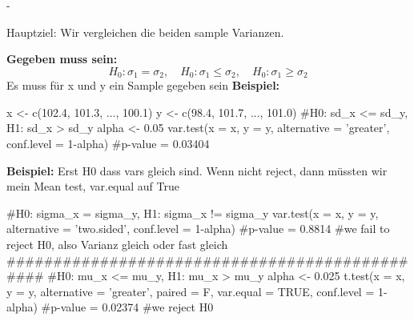 -

\begin{center}
    
\end{center}
\normalsize
Hauptziel: Wir vergleichen die beiden sample Varianzen.
\normalsize
\begin{center}
\end{center}

\large{\textbf{Gegeben muss sein:}}
\[
H_0: \sigma_1 = \sigma_2, \quad 
H_0: \sigma_1 \leq \sigma_2, \quad 
H_0: \sigma_1 \geq \sigma_2
\]
\textcolor{red}{\warning} Es muss für x und y ein Sample gegeben sein \textcolor{red}{\warning}
\large{\textbf{Beispiel:}}
\begin{rcode}{1}
x <- c(102.4, 101.3, ..., 100.1)
y <- c(98.4, 101.7, ..., 101.0)
#H0: sd_x <= sd_y, H1: sd_x > sd_y
alpha <- 0.05
var.test(x = x, y = y, alternative = 'greater', conf.level = 1-alpha)
#p-value = 0.03404
\end{rcode}

\large{\textbf{Beispiel:}}
\normalsize
Erst H0 dass vars gleich sind. Wenn nicht reject, dann müssten wir mein Mean test, var.equal auf True
\begin{rcode}{1}
#H0: sigma_x = sigma_y, H1: sigma_x != sigma_y
var.test(x = x, y = y, alternative = 'two.sided', conf.level = 1-alpha)
#p-value = 0.8814
#we fail to reject H0, also Varianz gleich oder fast gleich
###############################################
#H0: mu_x <= mu_y, H1: mu_x > mu_y
alpha <- 0.025
t.test(x = x, y = y, alternative = 'greater', paired = F, var.equal = TRUE, conf.level = 1-alpha)
#p-value = 0.02374
#we reject H0
\end{rcode}
